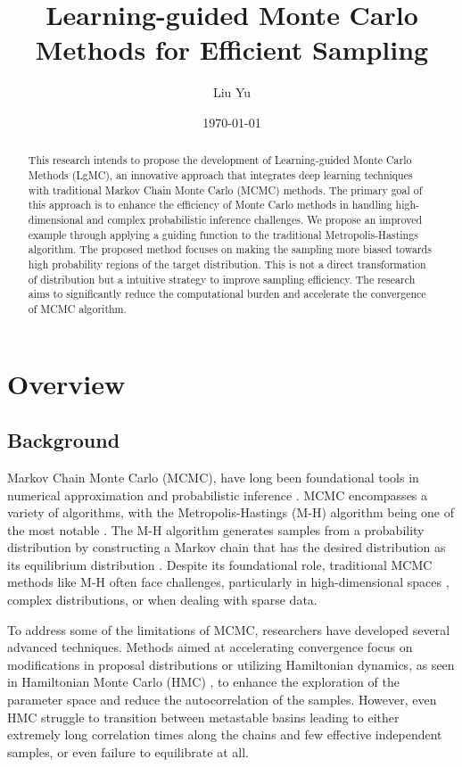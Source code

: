 \documentclass[twocolumn]{article}
\title{Learning-guided Monte Carlo Methods for Efficient Sampling}
\author{Liu Yu}
\date{\today}
\begin{document}
\maketitle

\begin{abstract}
This research intends to propose the development of Learning-guided Monte Carlo Methods (LgMC), an innovative approach that integrates deep learning techniques with traditional Markov Chain Monte Carlo (MCMC) methods. The primary goal of this approach is to enhance the efficiency of Monte Carlo methods in handling high-dimensional and complex probabilistic inference challenges. We propose an improved example through applying a guiding function to the traditional Metropolis-Hastings algorithm. The proposed method focuses on making the sampling more biased towards high probability regions of the target distribution. This is not a direct transformation of distribution but a intuitive strategy to improve sampling efficiency. The research aims to significantly reduce the computational burden and 
accelerate the convergence of MCMC algorithm.

\end{abstract}

\section{Overview}

\subsection{Background}
 Markov Chain Monte Carlo (MCMC), have long been foundational tools in numerical approximation and probabilistic inference . MCMC encompasses a variety of algorithms, with the Metropolis-Hastings (M-H) algorithm being one of the most notable \cite{metropolis1953equation}. The M-H algorithm generates samples from a probability distribution by constructing a Markov chain that has the desired distribution as its equilibrium distribution \cite{robert2004monte}. Despite its foundational role, traditional MCMC methods like M-H often face challenges, particularly in high-dimensional spaces \cite{gelman1995efficient}, complex distributions, or when dealing with sparse data.

To address some of the limitations of MCMC, researchers have developed several advanced techniques. Methods aimed at accelerating convergence focus on modifications in proposal distributions or utilizing Hamiltonian dynamics, as seen in Hamiltonian Monte Carlo (HMC) \cite{neal2011mcmc}, to enhance the exploration of the parameter space and reduce the autocorrelation of the samples. However, even HMC struggle to transition between metastable basins leading to either extremely long correlation times along the chains and few effective independent samples, or even failure to equilibrate at all. 
\end{document}

